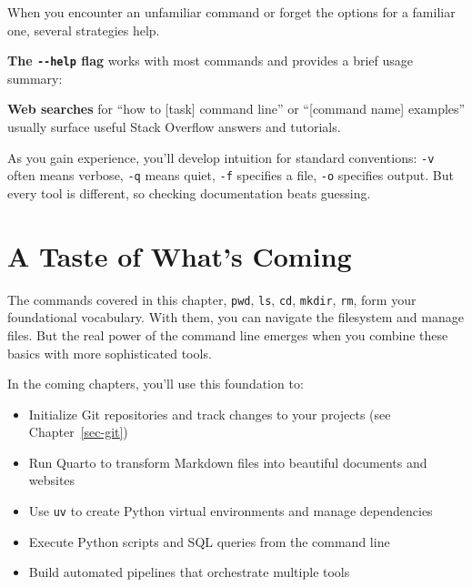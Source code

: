 \documentclass[
  letterpaper,
  DIV=11,
  numbers=noendperiod]{scrreprt}
\newenvironment{Shaded}{\begin{snugshade}}{\end{snugshade}}
\newcommand{\AttributeTok}[1]{\textcolor[rgb]{0.40,0.45,0.13}{#1}}
\newcommand{\ExtensionTok}[1]{\textcolor[rgb]{0.00,0.23,0.31}{#1}}
\newcommand{\NormalTok}[1]{\textcolor[rgb]{0.00,0.23,0.31}{#1}}
\providecommand{\tightlist}{%
  \setlength{\itemsep}{0pt}\setlength{\parskip}{0pt}}
\begin{document}
When you encounter an unfamiliar command or forget the options for a
familiar one, several strategies help.

\textbf{The \texttt{-\/-help} flag} works with most commands and
provides a brief usage summary:

\begin{codelisting}

\caption{\texttt{terminal}}

\begin{Shaded}
\end{Shaded}

\end{codelisting}

\textbf{Web searches} for ``how to {[}task{]} command line'' or
``{[}command name{]} examples'' usually surface useful Stack Overflow
answers and tutorials.

As you gain experience, you'll develop intuition for standard
conventions: \texttt{-v} often means verbose, \texttt{-q} means quiet,
\texttt{-f} specifies a file, \texttt{-o} specifies output. But every
tool is different, so checking documentation beats guessing.

\section{A Taste of What's Coming}\label{a-taste-of-whats-coming}

The commands covered in this chapter, \texttt{pwd}, \texttt{ls},
\texttt{cd}, \texttt{mkdir}, \texttt{rm}, form your foundational
vocabulary. With them, you can navigate the filesystem and manage files.
But the real power of the command line emerges when you combine these
basics with more sophisticated tools.

In the coming chapters, you'll use this foundation to:

\begin{itemize}
\tightlist
\item
  Initialize Git repositories and track changes to your projects (see
  Chapter~\ref{sec-git})
\item
  Run Quarto to transform Markdown files into beautiful documents and
  websites
\item
  Use \texttt{uv} to create Python virtual environments and manage
  dependencies
\item
  Execute Python scripts and SQL queries from the command line
\item
  Build automated pipelines that orchestrate multiple tools
\end{itemize}
\end{document}
